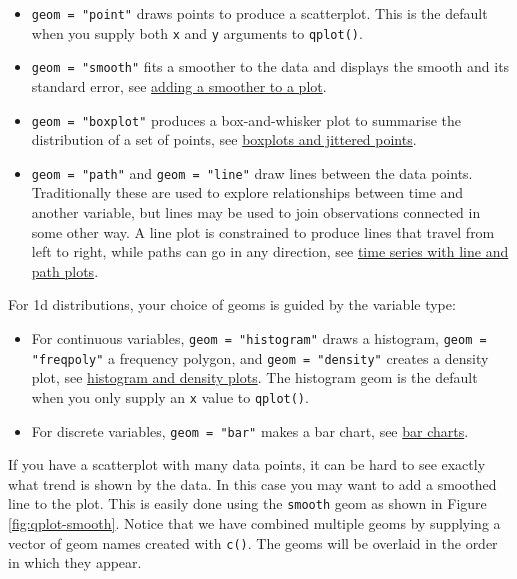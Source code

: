 \begin{itemize}
\item
  \texttt{geom = "point"} draws points to produce a scatterplot. This is
  the default when you supply both \texttt{x} and \texttt{y} arguments
  to \texttt{qplot()}.
\item
  \texttt{geom = "smooth"} fits a smoother to the data and displays the
  smooth and its standard error, see \hyperref[sub:smooth]{adding a
  smoother to a plot}.
\item
  \texttt{geom = "boxplot"} produces a box-and-whisker plot to summarise
  the distribution of a set of points, see
  \hyperref[sub:boxplot]{boxplots and jittered points}.
\item
  \texttt{geom = "path"} and \texttt{geom = "line"} draw lines between
  the data points. Traditionally these are used to explore relationships
  between time and another variable, but lines may be used to join
  observations connected in some other way. A line plot is constrained
  to produce lines that travel from left to right, while paths can go in
  any direction, see \hyperref[sub:line]{time series with line and path
  plots}.
\end{itemize}

\noindent For 1d distributions, your choice of geoms is guided by the
variable type:

\begin{itemize}
\item
  For continuous variables, \texttt{geom = "histogram"} draws a
  histogram, \texttt{geom = "freqpoly"} a frequency polygon, and
  \texttt{geom = "density"} creates a density plot, see
  \hyperref[sub:distribution]{histogram and density plots}. The
  histogram geom is the default when you only supply an \texttt{x} value
  to \texttt{qplot()}.
\item
  For discrete variables, \texttt{geom = "bar"} makes a bar chart, see
  \hyperref[sub:bar]{bar charts}.
\end{itemize}


If you have a scatterplot with many data points, it can be hard to see
exactly what trend is shown by the data. In this case you may want to
add a smoothed line to the plot. This is easily done using the
\texttt{smooth} geom as shown in Figure \ref{fig:qplot-smooth}. Notice
that we have combined multiple geoms by supplying a vector of geom names
created with \texttt{c()}. The geoms will be overlaid in the order in
which they appear.  

